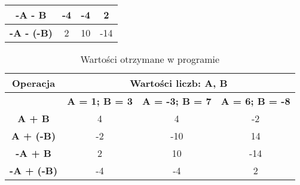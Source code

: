 \documentclass[12pt, a4paper, onside, polish]{article}				%
\begin{document}
\begin{table}[H]
\begin{tabular}{|c|ccc|}
\cellcolor[HTML]{EFEFEF}\textbf{-A - B}    & \multicolumn{1}{c|}{-4}                                            & \multicolumn{1}{c|}{-4}                                             & 2                                              \\ \hline
\cellcolor[HTML]{EFEFEF}\textbf{-A - (-B)} & \multicolumn{1}{c|}{2}                                             & \multicolumn{1}{c|}{10}                                             & -14                                            \\ \hline
\end{tabular}
\end{table}


\begin{table}[H]
\caption{Wartości otrzymane w programie}
\centering
\begin{tabular}{|c|ccc|}
\hline
\rowcolor[HTML]{9B9B9B} 
Operacja                                   & \multicolumn{3}{c|}{\cellcolor[HTML]{9B9B9B}Wartości liczb: A, B}                                                                                                                         \\ \hline
                                           & \multicolumn{1}{c|}{\cellcolor[HTML]{EFEFEF}\textbf{A = 1; B = 3}} & \multicolumn{1}{c|}{\cellcolor[HTML]{EFEFEF}\textbf{A = -3; B = 7}} & \cellcolor[HTML]{EFEFEF}\textbf{A = 6; B = -8} \\ \hline
\rowcolor[HTML]{32CB00} 
\cellcolor[HTML]{EFEFEF}\textbf{A + B}     & \multicolumn{1}{c|}{\cellcolor[HTML]{32CB00}4}                     & \multicolumn{1}{c|}{\cellcolor[HTML]{32CB00}4}                      & -2                                             \\ \hline
\rowcolor[HTML]{32CB00} 
\cellcolor[HTML]{EFEFEF}\textbf{A + (-B)}  & \multicolumn{1}{c|}{\cellcolor[HTML]{32CB00}-2}                    & \multicolumn{1}{c|}{\cellcolor[HTML]{32CB00}-10}                    & 14                                             \\ \hline
\rowcolor[HTML]{32CB00} 
\cellcolor[HTML]{EFEFEF}\textbf{-A + B}    & \multicolumn{1}{c|}{\cellcolor[HTML]{32CB00}2}                     & \multicolumn{1}{c|}{\cellcolor[HTML]{32CB00}10}                     & -14                                            \\ \hline
\rowcolor[HTML]{32CB00} 
\cellcolor[HTML]{EFEFEF}\textbf{-A + (-B)} & \multicolumn{1}{c|}{\cellcolor[HTML]{32CB00}-4}                    & \multicolumn{1}{c|}{\cellcolor[HTML]{32CB00}-4}                     & 2                                              \\ \hline

\end{tabular}
\end{table}
\end{document}
